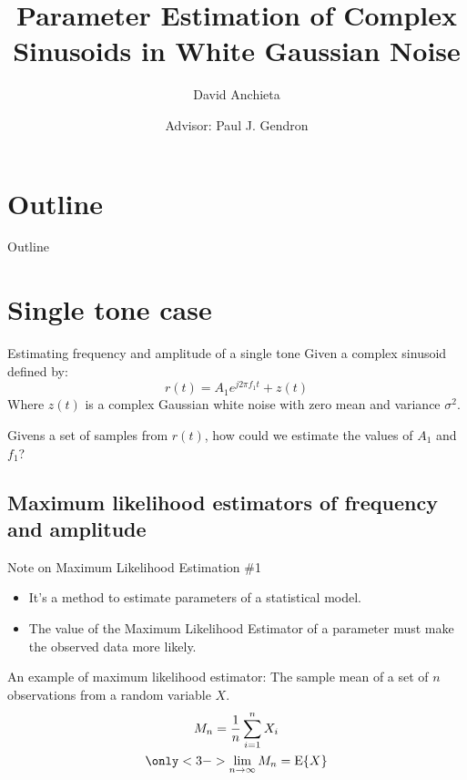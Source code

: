 ﻿\documentclass[mathserif]{beamer}
\title[Signal Parameter Estimation] %
{\textbf{Parameter Estimation of Complex Sinusoids in White Gaussian Noise}}
\author[Anchieta, Gendron] %
{David Anchieta \and Advisor: Paul J. Gendron}
\begin{document}
	\frame{\titlepage}

	\section*{Outline}
	\begin{frame}{Outline}		
		\tableofcontents
	\end{frame}
	
	\section{Single tone case}
	\begin{frame}{Estimating frequency and amplitude of a single tone}
		Given a complex sinusoid defined by:
		\begin{equation*}
			r(t) = A_{1}e^{j2\pi f_1 t} + z(t)
		\end{equation*}
		Where $z(t)$ is a complex Gaussian white noise with zero mean and variance $\sigma^2$.
		
		Givens a set of samples from $r(t)$, how could we estimate the values of $A_1$ and $f_1$?
		
		
		
	\end{frame}
	
	
	\subsection{Maximum likelihood estimators of frequency and amplitude}
	
	\begin{frame}{Note on Maximum Likelihood Estimation \#1}
		\begin{itemize}
			\item It's a method to estimate parameters of a statistical model.
			\item The value of the Maximum Likelihood Estimator of a parameter must make the observed data more likely.
		\end{itemize}
		\pause
		An example of maximum likelihood estimator: The sample mean of a set of $n$ observations from a random variable $X$.
		\begin{gather*}
			M_n = \frac{1}{n}\sum_{i=1}^nX_i\\
			\only<3->{ \lim_{n \to \infty}M_n = \mathrm{E}\{X\}}
		\end{gather*}
	\end{frame}
	
\end{document}
